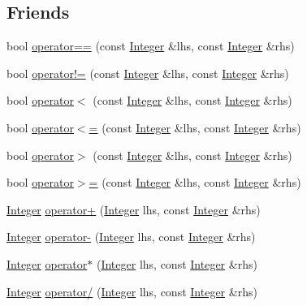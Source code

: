 \subsection*{Friends}
\begin{DoxyCompactItemize}
\item 
bool \hyperlink{class_integer_a01445511d8a430434af376416063d71d}{operator==} (const \hyperlink{class_integer}{Integer} \&lhs, const \hyperlink{class_integer}{Integer} \&rhs)
\item 
bool \hyperlink{class_integer_ad391df8dc93626907e924ff3fd9b1e2d}{operator!=} (const \hyperlink{class_integer}{Integer} \&lhs, const \hyperlink{class_integer}{Integer} \&rhs)
\item 
bool \hyperlink{class_integer_a1205f04dd79ca17ef200a09eb894bab4}{operator$<$} (const \hyperlink{class_integer}{Integer} \&lhs, const \hyperlink{class_integer}{Integer} \&rhs)
\item 
bool \hyperlink{class_integer_a730ae17a06ce6ea59504868598d061dd}{operator$<$=} (const \hyperlink{class_integer}{Integer} \&lhs, const \hyperlink{class_integer}{Integer} \&rhs)
\item 
bool \hyperlink{class_integer_a0007c8d2187897b1e1675677bf432146}{operator$>$} (const \hyperlink{class_integer}{Integer} \&lhs, const \hyperlink{class_integer}{Integer} \&rhs)
\item 
bool \hyperlink{class_integer_afad00c6a35103e4597423c97c25c4ae9}{operator$>$=} (const \hyperlink{class_integer}{Integer} \&lhs, const \hyperlink{class_integer}{Integer} \&rhs)
\item 
\hyperlink{class_integer}{Integer} \hyperlink{class_integer_a8a111f64cebbf58268d9b60f93d5e542}{operator+} (\hyperlink{class_integer}{Integer} lhs, const \hyperlink{class_integer}{Integer} \&rhs)
\item 
\hyperlink{class_integer}{Integer} \hyperlink{class_integer_a42aae7e62188ee2db3daf01b2888a1f2}{operator-\/} (\hyperlink{class_integer}{Integer} lhs, const \hyperlink{class_integer}{Integer} \&rhs)
\item 
\hyperlink{class_integer}{Integer} \hyperlink{class_integer_a48386930c1e622d19df197393f6be01a}{operator$\ast$} (\hyperlink{class_integer}{Integer} lhs, const \hyperlink{class_integer}{Integer} \&rhs)
\item 
\hyperlink{class_integer}{Integer} \hyperlink{class_integer_aeaafaff40a58b3724192ef0e759788b5}{operator/} (\hyperlink{class_integer}{Integer} lhs, const \hyperlink{class_integer}{Integer} \&rhs)
\item 

\end{DoxyCompactItemize}
